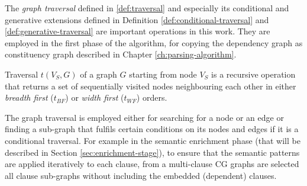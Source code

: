 %

The \textit{graph traversal} defined in \ref{def:traversal} and especially its conditional and generative extensions defined in Definition \ref{def:conditional-traversal} and \ref{def:generative-traversal} are  important operations in this work. They are employed in the first phase of the algorithm, for copying the dependency graph as constituency graph described in Chapter \ref{ch:parsing-algorithm}. 

\begin{definition}[Traversal]\label{def:traversal}
    Traversal $t(V_S,G)$ of a graph $G$ starting from node $V_S$ is a recursive operation that returns a set of sequentially visited nodes neighbouring each other in either \textit{breadth first} ($t_{BF}$) or \textit{width first} ($t_{WF}$) orders.
\end{definition}

The graph traversal is employed either for searching for a node or an edge or finding a sub-graph that fulfils certain conditions on its nodes and edges if it is a conditional traversal. For example in the semantic enrichment phase (that will be described in Section \ref{sec:enrichment-stage}), to ensure that the semantic patterns are applied iteratively to each clause, from a multi-clause CG graphs are selected all clause sub-graphs without including the embedded (dependent) clauses. 

